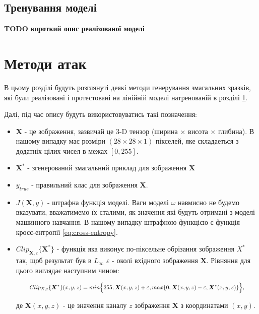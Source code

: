 \documentclass[a4paper,12pt]{extreport}
\begin{document}
	\section{Тренування моделі}
	\label{sec:model}
	\large{\textbf{TODO короткий опис реалізованої моделі}} \\
	
	\chapter{Методи атак}
	В цьому розділі будуть розглянуті деякі методи генерування змагальних зразків, які були реалізовані і протестовані на лінійній моделі натренованій в розділі \ref{sec:model}.
	
	Далі, під час опису будуть використовуватись такі позначення:
	\begin{itemize}
		\item $\boldsymbol{X}$ - це зображення, зазвичай це 3-D тензор (ширина $\times$ висота $\times$ глибина). В нашому випадку має розміри $(28 \times 28 \times 1)$ пікселей, яке складаеться з додатніх цілих чисел в межах $[0, 255]$.
		\item $\boldsymbol{X}^{*}$ - згенерований змагальний приклад для зображення $\boldsymbol{X}$
		\item $y_{true}$ - правильний клас для зображення $\boldsymbol{X}$.
		\item $J(\boldsymbol{X}, y)$ - штрафна функція моделі. Ваги моделі $\omega$ навмисно не будемо вказувати, вважатимемо їх сталими, як значення які будуть отримані з моделі машинного навчання. В нашому випадку штрафною функцією є функція кросс-ентропії \ref{eq:cross-entropy}. 
		\item $Clip_{\boldsymbol{X}, \varepsilon} \{ \boldsymbol{X}^{*} \}$ - функція яка виконує по-піксельне обрізання зображення $X^{*}$ так, щоб результат був в $L_{\infty}$ $\varepsilon $ - околі вхідного зображення $\boldsymbol{X}$. Рівняння для цього виглядає наступним чином:
		
		\begingroup
		\setlength{\abovedisplayskip}{0pt}
		\setlength{\belowdisplayskip}{0pt}
		\begin{align}
		\label{eq:clip}
		\resizebox{.9 \textwidth}{!} 
		{
			$
			Clip_{X, \varepsilon} \{ \boldsymbol{X}^{*} \}(x, y, z) = 
			min\Big\{ 255, \boldsymbol{X}(x, y, z) + \varepsilon, max \{ 0, \boldsymbol{X}(x, y, z) - \varepsilon, \boldsymbol{X}^{*}(x, y, z) \} \Big\}
			$,
		}
		\end{align}
		\endgroup

		де $\boldsymbol{X}(x, y, z)$ - це значення каналу $z$ зображення $\boldsymbol{X}$ з координатами $(x, y)$.
	\end{itemize}
\end{document}
